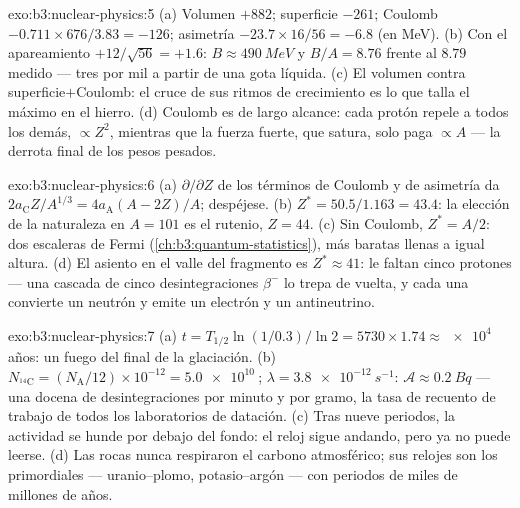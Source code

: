 \begin{solution}{exo:b3:nuclear-physics:5}
(a) Volumen $+882$; superficie $-261$; Coulomb $-0.711\times676/3.83
= -126$; asimetría $-23.7\times16/56 = -6.8$ (en \unit{MeV}). (b)
Con el apareamiento $+12/\sqrt{56} = +1.6$: $B \approx \qty{490}{MeV}$ y
$B/A = 8.76$ frente al $8.79$ medido --- tres por mil
a partir de una gota líquida. (c) El volumen contra superficie$+$Coulomb: el
cruce de sus ritmos de crecimiento es lo que talla el máximo en el hierro.
(d) Coulomb es de largo alcance: cada protón repele a todos los demás,
$\propto Z^2$, mientras que la fuerza fuerte, que satura, solo paga
$\propto A$ --- la derrota final de los pesos pesados.
\end{solution}

\begin{solution}{exo:b3:nuclear-physics:6}
(a) $\partial/\partial Z$ de los términos de Coulomb y de asimetría
da $2a_{\text{C}}Z/A^{1/3} = 4a_{\text{A}}(A - 2Z)/A$; despéjese.
(b) $Z^* = 50.5/1.163 = 43.4$: la elección de la naturaleza en $A = 101$ es
el rutenio, $Z = 44$. (c) Sin Coulomb, $Z^* = A/2$: dos escaleras
de Fermi (\cref{ch:b3:quantum-statistics}), más baratas llenas
a igual altura. (d) El asiento en el valle del fragmento es $Z^* \approx 41$:
le faltan cinco protones --- una cascada de cinco desintegraciones $\beta^-$ lo trepa
de vuelta, y cada una convierte un neutrón y emite un electrón y un
antineutrino.
\end{solution}

\begin{solution}{exo:b3:nuclear-physics:7}
(a) $t = T_{1/2}\ln(1/0.3)/\ln2 = 5730\times1.74 \approx
\qty{e4}{}$ años: un fuego del final de la glaciación. (b) $N_{^{14}\text{C}}
= (N_{\text{A}}/12)\times10^{-12} = \qty{5.0e10}{}$; $\lambda =
\qty{3.8e-12}{s^{-1}}$: $\mathcal A \approx \qty{0.2}{Bq}$ ---
una docena de desintegraciones por minuto y por gramo, la tasa de recuento de trabajo de
todos los laboratorios de datación. (c) Tras nueve periodos, la actividad
se hunde por debajo del fondo: el reloj sigue andando, pero ya no puede
leerse. (d) Las rocas nunca respiraron el carbono atmosférico; sus
relojes son los primordiales --- uranio--plomo,
potasio--argón --- con periodos de miles de millones de años.
\end{solution}

